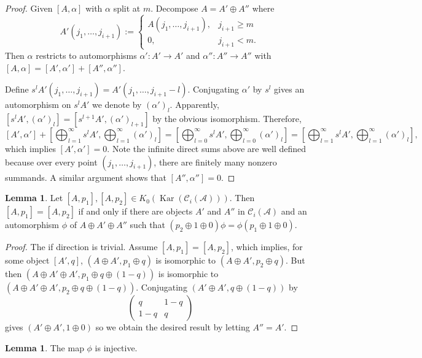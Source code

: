 \documentclass{article}
\theoremstyle{definition}
\newtheorem{lem}[theorem]{Lemma}
\newcommand{\CA}{{ \mathcal A}}
\def \al {\alpha}
\begin{document}
\begin{proof}
    Given $[A, \alpha]$ with $\alpha$ split at $m$. Decompose $A=A'\oplus A''$ where 
    $$A'(j_1, \dots, j_{i+1}):=\begin{cases}
        A(j_1, \dots, j_{i+1}), & j_{i+1} \geq m\\
        0, & j_{i+1}<m.
    \end{cases}$$
    Then $\alpha$ restricts to automorphisms $\alpha': A'\rightarrow A'$ and $\alpha'': A''\rightarrow A''$ with $[A, \al]=[A', \alpha']+[A'', \alpha'']$. 

    Define $s^lA' (j_1, \dots, j_{i+1})=A' (j_1, \dots, j_{i+1}-l)$. Conjugating $\al'$ by $s^l$ gives an automorphism on $s^lA'$ we denote by $(\al')_l.$ Apparently, $[s^{l}A', (\al')_{l}]=[s^{l+1}A', (\al')_{l+1}]$ by the obvious isomorphism. Therefore, 
    $$ [A', \al']+\left[\bigoplus_{l=1}^\infty s^l A', \bigoplus_{l=1}^\infty (\al')_l\right]=\left[\bigoplus_{l=0}^\infty s^l A', \bigoplus_{l=0}^\infty (\al')_l\right] = \left[\bigoplus_{l=1}^\infty s^l A', \bigoplus_{l=1}^\infty (\al')_l\right],$$
    which implies $[A', \alpha']=0.$ Note the infinite direct sums above are well defined because over every point $(j_1, \dots, j_{i+1})$, there are finitely many nonzero summands. A similar argument shows that $[A'', \alpha'']=0.$
\end{proof}
\begin{lem}
    Let $[A, p_1], [A, p_2]\in K_0(\operatorname{Kar}(\mathcal{C}_{i}(\CA)))$. Then $[A, p_1]=[A, p_2]$ if and only if there are objects $A'$ and $A''$ in $\mathcal{C}_{i}(\CA)$ and an automorphism $\phi$ of $A\oplus A'\oplus A''$ such that $(p_2\oplus 1\oplus 0)  \phi=\phi   (p_1\oplus 1\oplus 0)$.
\end{lem}
\begin{proof}
    The if direction is trivial. Assume $[A, p_1]=[A, p_2]$, which implies, for some object $[A', q]$, \((A \oplus A', p_1 \oplus q)\) is isomorphic to 
\((A \oplus A', p_2 \oplus q)\). But then \((A \oplus A' \oplus A', p_1 \oplus q \oplus (1 - q))\) is isomorphic to 
\((A \oplus A' \oplus A', p_2 \oplus q \oplus (1 - q))\). Conjugating \((A' \oplus A', q \oplus (1 - q))\) by 
\[
\ \begin{pmatrix}
q & 1 - q \\
1 - q & q
\end{pmatrix} 
\]
gives \((A' \oplus A', 1 \oplus 0)\) so we obtain the desired result by letting \(A'' = A'\). 

\end{proof}
\begin{lem}
    The map $\phi$ is injective.
\end{lem}
\end{document}
